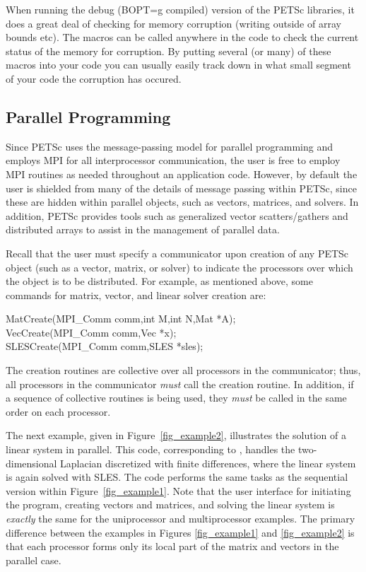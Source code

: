 When running the debug (BOPT=g compiled) version of the PETSc libraries, it
does a great deal of checking for memory corruption (writing outside of 
array bounds etc). The macros  can be called 
anywhere in the code to check the current status of the memory for corruption.
By putting several (or many) of these macros into your code you can usually 
easily track down in what small segment of your code the corruption has occured.

\subsection*{Parallel Programming}

Since PETSc uses the message-passing model for
parallel programming and employs MPI for all interprocessor
communication, the user is free to employ MPI routines as needed
throughout an application code.  However, by default the user is
shielded from many of the details of message passing within PETSc,
since these are hidden within parallel objects, such as vectors,
matrices, and solvers.  In addition, PETSc provides tools such as
generalized vector scatters/gathers and distributed arrays to assist
in the management of parallel data.

Recall that the user must specify a communicator upon creation of any
PETSc object (such as a vector, matrix, or solver) to indicate the
processors over which the object is to be distributed.  For example,
as mentioned above, some commands for matrix, vector, and linear solver
creation are:
\begin{tabbing}
  MatCreate(MPI\_Comm comm,int M,int N,Mat *A);\\
  VecCreate(MPI\_Comm comm,Vec *x);\\
  SLESCreate(MPI\_Comm comm,SLES *sles); 
\end{tabbing}
The creation routines are collective over all processors in the
communicator; thus, all processors in the communicator {\em must}
call the creation routine.  In addition, if a sequence of
collective routines is being used, they {\em must} be called
in the same order on each processor.

The next example, given in Figure~\ref{fig_example2}, illustrates the
solution of a linear system in parallel.  This code, corresponding to
, handles the
two-dimensional Laplacian discretized with finite differences, where
the linear system is again solved with SLES.  The code performs the
same tasks as the sequential version within Figure~\ref{fig_example1}.
Note that the user interface for initiating the program, creating
vectors and matrices, and solving the linear system is {\em exactly}
the same for the uniprocessor and multiprocessor examples.  The
primary difference between the examples in Figures \ref{fig_example1}
and \ref{fig_example2} is that each processor forms only its local
part of the matrix and vectors in the parallel case.

